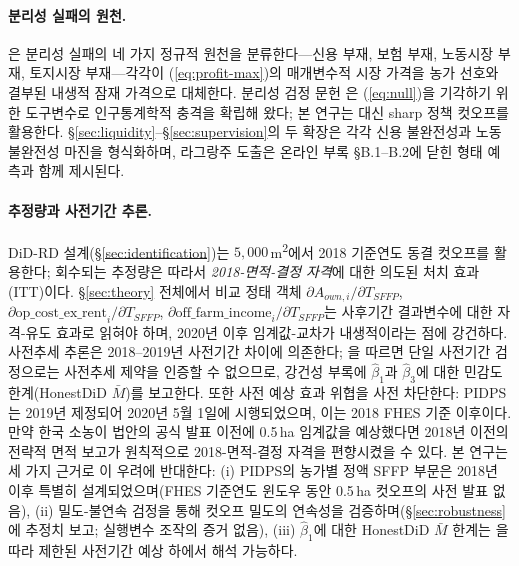 \documentclass[12pt, a4paper]{article}
\begin{document}
\paragraph{분리성 실패의 원천.} \citet{deJanvryFafchampsSadoulet1991_peasant}은 분리성 실패의 네 가지 정규적 원천을 분류한다---신용 부재, 보험 부재, 노동시장 부재, 토지시장 부재---각각이 (\ref{eq:profit-max})의 매개변수적 시장 가격을 농가 선호와 결부된 내생적 잠재 가격으로 대체한다. 분리성 검정 문헌 \citep{Benjamin1992_separation, LaFaveThomas2016_markets}은 (\ref{eq:null})을 기각하기 위한 도구변수로 인구통계학적 충격을 확립해 왔다; 본 연구는 대신 sharp 정책 컷오프를 활용한다. \S\ref{sec:liquidity}--\S\ref{sec:supervision}의 두 확장은 각각 신용 불완전성과 노동 불완전성 마진을 형식화하며, 라그랑주 도출은 온라인 부록 \S B.1--B.2에 닫힌 형태 예측과 함께 제시된다.

\paragraph{추정량과 사전기간 추론.} DiD-RD 설계(\S\ref{sec:identification})는 $5{,}000$\,m\textsuperscript{2}에서 2018 기준연도 동결 컷오프를 활용한다; 회수되는 추정량은 따라서 \emph{2018-면적-결정 자격}에 대한 의도된 처치 효과(ITT)이다. \S\ref{sec:theory} 전체에서 비교 정태 객체 $\partial A_{own,i}/\partial T_{SFFP}$, $\partial \text{op\_cost\_ex\_rent}_i/\partial T_{SFFP}$, $\partial \text{off\_farm\_income}_i/\partial T_{SFFP}$는 사후기간 결과변수에 대한 자격-유도 효과로 읽혀야 하며, 2020년 이후 임계값-교차가 내생적이라는 점에 강건하다. 사전추세 추론은 2018--2019년 사전기간 차이에 의존한다; \citet{Roth2022_pretrends}을 따르면 단일 사전기간 검정으로는 사전추세 제약을 인증할 수 없으므로, 강건성 부록에 $\hat\beta_1$과 $\hat\beta_3$에 대한 \citet{RambachanRoth2023_honestdid} 민감도 한계(HonestDiD $\bar M$)를 보고한다. 또한 사전 예상 효과 위협을 사전 차단한다: PIDPS는 2019년 제정되어 2020년 5월 1일에 시행되었으며, 이는 2018 FHES 기준 이후이다. 만약 한국 소농이 법안의 공식 발표 이전에 0.5\,ha 임계값을 예상했다면 2018년 이전의 전략적 면적 보고가 원칙적으로 2018-면적-결정 자격을 편향시켰을 수 있다. 본 연구는 세 가지 근거로 이 우려에 반대한다: (i) PIDPS의 농가별 정액 SFFP 부문은 2018년 이후 특별히 설계되었으며(FHES 기준연도 윈도우 동안 0.5\,ha 컷오프의 사전 발표 없음), (ii) \citet{McCrary2008_density} 밀도-불연속 검정을 통해 컷오프 밀도의 연속성을 검증하며(\S\ref{sec:robustness}에 추정치 보고; 실행변수 조작의 증거 없음), (iii) $\hat\beta_1$에 대한 HonestDiD $\bar M$ 한계는 \citet{RambachanRoth2023_honestdid}을 따라 제한된 사전기간 예상 하에서 해석 가능하다.
\end{document}
